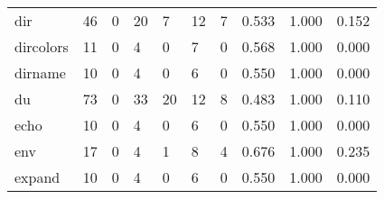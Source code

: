 \begin{longtable}{lp{2.0cm}p{2.0cm}p{2.0cm}p{2.0cm}p{2.0cm}p{2.0cm}p{2.0cm}p{2.0cm}p{2.0cm}}
dir       &                     46 &                                             0 &                                           20 &                                           7 &                                           12 &                                          7 &                                0.533 &                                  1.000 &                                0.152 \\
dircolors &                     11 &                                             0 &                                            4 &                                           0 &                                            7 &                                          0 &                                0.568 &                                  1.000 &                                0.000 \\
dirname   &                     10 &                                             0 &                                            4 &                                           0 &                                            6 &                                          0 &                                0.550 &                                  1.000 &                                0.000 \\
du        &                     73 &                                             0 &                                           33 &                                          20 &                                           12 &                                          8 &                                0.483 &                                  1.000 &                                0.110 \\
echo      &                     10 &                                             0 &                                            4 &                                           0 &                                            6 &                                          0 &                                0.550 &                                  1.000 &                                0.000 \\
env       &                     17 &                                             0 &                                            4 &                                           1 &                                            8 &                                          4 &                                0.676 &                                  1.000 &                                0.235 \\
expand    &                     10 &                                             0 &                                            4 &                                           0 &                                            6 &                                          0 &                                0.550 &                                  1.000 &                                0.000 \\

\end{longtable}
